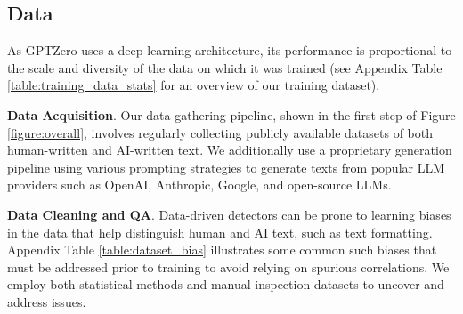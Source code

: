 \documentclass[11pt]{article}
\newcommand{\lee}[1]{{\color{purple}{DL: #1}}}
\newcommand{\gptzero}{GPTZero}
\begin{document}
\subsection{Data}


As \gptzero{} uses a deep learning architecture, its performance is proportional to the scale and diversity of the data on which it was trained (see Appendix Table \ref{table:training_data_stats} for an overview of our training dataset).

\textbf{Data Acquisition}. Our data gathering pipeline, shown in the first step of Figure \ref{figure:overall}, involves regularly collecting publicly available datasets of both human-written and AI-written text.
We additionally use a proprietary generation pipeline using various prompting strategies to generate texts from popular LLM providers such as OpenAI, Anthropic, Google, and open-source LLMs.  



\textbf{Data Cleaning and QA}. Data-driven detectors can be prone to learning biases in the data that help distinguish human and AI text, such as text formatting.
Appendix Table \ref{table:dataset_bias} illustrates some common such biases that must be addressed prior to training to avoid relying on spurious correlations.
We employ both statistical methods and manual inspection datasets to uncover and address issues. 
\end{document}
